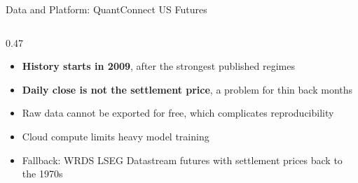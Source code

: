 \documentclass[10pt, aspectratio=169]{beamer}
\newcommand{\key}[1]{\textcolor{accent}{\textbf{#1}}}
\begin{document}
\begin{frame}{Data and Platform: QuantConnect US Futures}
\begin{columns}[T, onlytextwidth]
\begin{column}{0.47\textwidth}
\begin{itemize}
  \item[\textcolor{accent}{$-$}] \key{History starts in 2009}, after the strongest published regimes
  \item[\textcolor{accent}{$-$}] \key{Daily close is not the settlement price}, a problem for thin back months
  \item[\textcolor{accent}{$-$}] Raw data cannot be exported for free, which complicates reproducibility
  \item[\textcolor{accent}{$-$}] Cloud compute limits heavy model training
  \item Fallback: WRDS LSEG Datastream futures with settlement prices back to the 1970s
\end{itemize}
\end{column}
\end{columns}
\end{frame}
\end{document}
